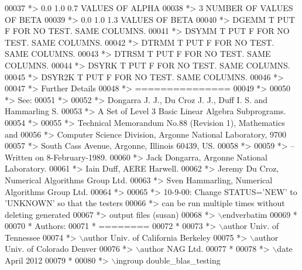 \begin{DoxyCode}
00037 \textcolor{comment}{*> 0.0 1.0 0.7       VALUES OF ALPHA}
00038 \textcolor{comment}{*> 3                 NUMBER OF VALUES OF BETA}
00039 \textcolor{comment}{*> 0.0 1.0 1.3       VALUES OF BETA}
00040 \textcolor{comment}{*> DGEMM  T PUT F FOR NO TEST. SAME COLUMNS.}
00041 \textcolor{comment}{*> DSYMM  T PUT F FOR NO TEST. SAME COLUMNS.}
00042 \textcolor{comment}{*> DTRMM  T PUT F FOR NO TEST. SAME COLUMNS.}
00043 \textcolor{comment}{*> DTRSM  T PUT F FOR NO TEST. SAME COLUMNS.}
00044 \textcolor{comment}{*> DSYRK  T PUT F FOR NO TEST. SAME COLUMNS.}
00045 \textcolor{comment}{*> DSYR2K T PUT F FOR NO TEST. SAME COLUMNS.}
00046 \textcolor{comment}{*>}
00047 \textcolor{comment}{*> Further Details}
00048 \textcolor{comment}{*> ===============}
00049 \textcolor{comment}{*>}
00050 \textcolor{comment}{*> See:}
00051 \textcolor{comment}{*>}
00052 \textcolor{comment}{*>    Dongarra J. J., Du Croz J. J., Duff I. S. and Hammarling S.}
00053 \textcolor{comment}{*>    A Set of Level 3 Basic Linear Algebra Subprograms.}
00054 \textcolor{comment}{*>}
00055 \textcolor{comment}{*>    Technical Memorandum No.88 (Revision 1), Mathematics and}
00056 \textcolor{comment}{*>    Computer Science Division, Argonne National Laboratory, 9700}
00057 \textcolor{comment}{*>    South Cass Avenue, Argonne, Illinois 60439, US.}
00058 \textcolor{comment}{*>}
00059 \textcolor{comment}{*> -- Written on 8-February-1989.}
00060 \textcolor{comment}{*>    Jack Dongarra, Argonne National Laboratory.}
00061 \textcolor{comment}{*>    Iain Duff, AERE Harwell.}
00062 \textcolor{comment}{*>    Jeremy Du Croz, Numerical Algorithms Group Ltd.}
00063 \textcolor{comment}{*>    Sven Hammarling, Numerical Algorithms Group Ltd.}
00064 \textcolor{comment}{*>}
00065 \textcolor{comment}{*>    10-9-00:  Change STATUS='NEW' to 'UNKNOWN' so that the testers}
00066 \textcolor{comment}{*>              can be run multiple times without deleting generated}
00067 \textcolor{comment}{*>              output files (susan)}
00068 \textcolor{comment}{*> \(\backslash\)endverbatim}
00069 \textcolor{comment}{*}
00070 \textcolor{comment}{*  Authors:}
00071 \textcolor{comment}{*  ========}
00072 \textcolor{comment}{*}
00073 \textcolor{comment}{*> \(\backslash\)author Univ. of Tennessee }
00074 \textcolor{comment}{*> \(\backslash\)author Univ. of California Berkeley }
00075 \textcolor{comment}{*> \(\backslash\)author Univ. of Colorado Denver }
00076 \textcolor{comment}{*> \(\backslash\)author NAG Ltd. }
00077 \textcolor{comment}{*}
00078 \textcolor{comment}{*> \(\backslash\)date April 2012}
00079 \textcolor{comment}{*}
00080 \textcolor{comment}{*> \(\backslash\)ingroup double\_blas\_testing}

\end{DoxyCode}
